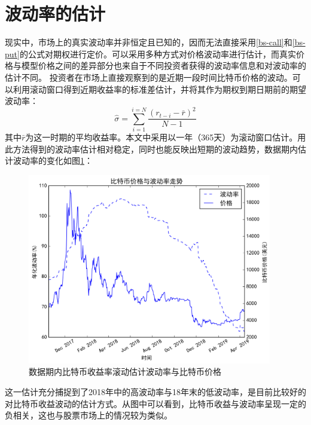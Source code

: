 \section{波动率的估计}\label{volatility-estimation}
现实中，市场上的真实波动率并非恒定且已知的，因而无法直接采用\ref{bs-call}和\ref{bs-put}的公式对期权进行定价。可以采用多种方式对价格波动率进行估计，而真实价格与模型价格之间的差异部分也来自于不同投资者获得的波动率信息和对波动率的估计不同。
投资者在市场上直接观察到的是近期一段时间比特币价格的波动。可以利用滚动窗口得到近期收益率的标准差估计，并将其作为期权到期日期前的期望波动率：
\begin{equation}\label{volatility-rolling}
\hat{\sigma}=\sum_{i=1}^{i=N}\frac{(r_{t-i}-\bar{r})^2}{N-1}
\end{equation}
其中$\bar{r}$为这一时期的平均收益率。本文中采用以一年（365天）为滚动窗口估计。用此方法得到的波动率估计相对稳定，同时也能反映出短期的波动趋势，数据期内估计波动率的变化如图\ref{fig:volatility}：
\begin{figure}[H]
\begin{small} 
\begin{center}
    \includegraphics[width=0.95\textwidth]{figures/volatility.png}
\end{center}
\caption{数据期内比特币收益率滚动估计波动率与比特币价格}
\label{fig:volatility}
\end{small}
\end{figure}
这一估计充分捕捉到了2018年中的高波动率与18年末的低波动率，是目前比较好的对比特币收益波动的估计方式。从图中可以看到，比特币收益与波动率呈现一定的负相关，这也与股票市场上的情况较为类似。
